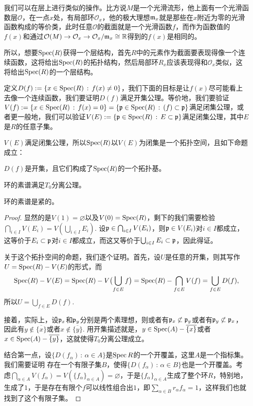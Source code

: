 我们可以在层上进行类似的操作。比方说$M$是一个光滑流形，他上面有一个光滑函数层$\mathcal{O}$，在一点$x$处，有局部环$\mathcal{O}_x$，他的极大理想$\mathfrak{m}_x$就是那些在$x$附近为零的光滑函数构成的等价类，此时任意$\mathcal{O}$的截面就是一个光滑函数$f$，而作为函数值的$f(x)$和通过$\mathcal{O}(M)\to \mathcal{O}_x\to \mathcal{O}_x/\mathfrak{m}_x\cong \mathbb{R}$得到的$f(x)$是相同的。

所以，想要$\operatorname{Spec}(R)$获得一个层结构，首先$R$中的元素作为截面要表现得像一个连续函数，这将给出$\operatorname{Spec}(R)$的拓扑结构，然后局部环$R_x$应该表现得和$\mathcal{O}_x$类似，这将给出$\operatorname{Spec}(R)$的一个层结构。

\begin{para}[素谱的拓扑结构]
定义$D(f):=\{x\in \operatorname{Spec}(R)\,:\, f(x)\neq 0\}$，我们下面的目标是让$f(x)$尽可能看上去像一个连续函数，我们要证明$D(f)$满足开集公理。等价地，我们要验证$V(f):=\{x\in \operatorname{Spec}(R)\,:\, f(x)=0\}=\{\mathfrak{p}\in \operatorname{Spec}(R)\,:\, (f)\subset \mathfrak{p}\}$满足闭集公理，或者更一般地，我们可以验证$V(E):=\{\mathfrak{p}\in \operatorname{Spec}(R)\,:\, E\subset \mathfrak{p}\}$满足闭集公理，其中$E$是$R$的任意子集。
\end{para}

\begin{pro}\label{pro:3.4}
$V(E)$满足闭集公理，所以$\operatorname{Spec}(R)$以$V(E)$为闭集是一个拓扑空间，且如下命题成立：
\begin{compactenum}
\item $D(f)$是开集，且它们构成了$\operatorname{Spec}(R)$的一个拓扑基。
\item 环的素谱满足$T_0$分离公理。
\item 环的素谱是紧的。
\end{compactenum}
\end{pro}

\begin{proof}
显然的是$V(1)=\varnothing$以及$V(0)=\operatorname{Spec}(R)$，剩下的我们需要检验$\bigcap_{i\in I}V(E_i)=V(\bigcup_{i\in I}E_i)$. 设$\mathfrak{p} \in \bigcap_{i\in I}V(E_i)$，则$\mathfrak{p}\in V(E_i)$对$i\in I$都成立，这等价于$E_i\subset \mathfrak{p}$对$i\in I$都成立，而这又等价于$\bigcup_{i\in I}E_i \subset \mathfrak{p}$，因此得证。

关于这个拓扑空间的命题，我们逐个证明。首先，设$U$是任意的开集，则其写作$U=\operatorname{Spec}(R)-V(E)$的形式，而
\[
\operatorname{Spec}(R)-V(E)=\operatorname{Spec}(R)-V\bigl(\bigcup_{f\in E} f\bigr)=\operatorname{Spec}(R)-\bigcap_{f\in E}V(f)=\bigcup_{f\in E}D(f),
\]
所以$U=\bigcup_{f\in E}D(f)$.

接着，实际上，设$\mathfrak{p}_x$和$\mathfrak{p}_y$分别是两个素理想，则或者有$\mathfrak{p}_x\not\subset \mathfrak{p}_y$或者有$\mathfrak{p}_y\not\subset \mathfrak{p}_x$，因此有$y\not\in \overline{\{x\}}$或者$x\not\in \overline{\{y\}}$. 用开集描述就是，$y\in \operatorname{Spec}(A)-\overline{\{x\}}$或者$x\in \operatorname{Spec}(A)-\overline{\{y\}}$，这就使得$T_0$分离公理成立。

结合第一点，设$\{D(f_\alpha)\,:\, \alpha\in A\}$是$\operatorname{Spec} R$的一个开覆盖，这里$A$是一个指标集。我们需要证明
存在一个有限子集$B$，使得$\{D(f_\alpha)\,:\, \alpha\in B\}$也是一个开覆盖。考虑$\bigcap_{\alpha\in A}V(f_\alpha)=V(\{f_\alpha\}_{\alpha\in A})=\varnothing$，于是$\{f_\alpha\}_{\alpha\in A}$生成了整个环$R$，特别地，生成了$1$，于是存在有限个$f$可以线性组合出$1$，即$\sum_{\alpha\in B} r_\alpha f_\alpha=1$，这样我们也就找到了这个有限子集。
\end{proof}

